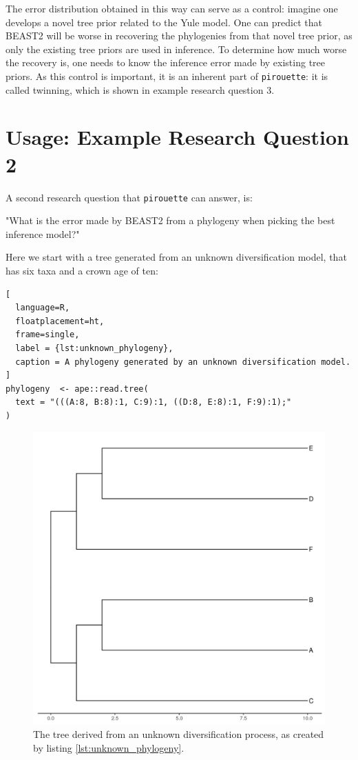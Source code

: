 \documentclass{article}
\begin{document}
The error distribution obtained in this way can serve as a control:
imagine one develops a novel tree prior related to the Yule model.
One can predict that BEAST2 will be worse in recovering the phylogenies
from that novel tree prior, as only the existing tree priors are used
in inference. 
To determine how much worse the recovery is, one needs to know the 
inference error made by existing tree priors. 
As this control is important, it is an inherent part of \verb;pirouette;:
it is called twinning, which is shown in example research question 3.

\section{Usage: Example Research Question 2}

A second research question that \verb;pirouette; can answer, is:

"What is the error made by BEAST2 from a phylogeny when
picking the best inference model?"

Here we start with a tree generated from an unknown 
diversification model, that has six taxa and a crown age of ten:

\begin{lstlisting}[
  language=R, 
  floatplacement=ht, 
  frame=single, 
  label = {lst:unknown_phylogeny},
  caption = A phylogeny generated by an unknown diversification model.
]
phylogeny  <- ape::read.tree(
  text = "(((A:8, B:8):1, C:9):1, ((D:8, E:8):1, F:9):1);"
)
\end{lstlisting}
\begin{figure}[ht]
  \includegraphics[width=\textwidth]{tree_unknown.png}
  \caption{The tree derived from an unknown diversification process, 
    as created by listing \ref{lst:unknown_phylogeny}.
  }
\end{figure}
\end{document}
